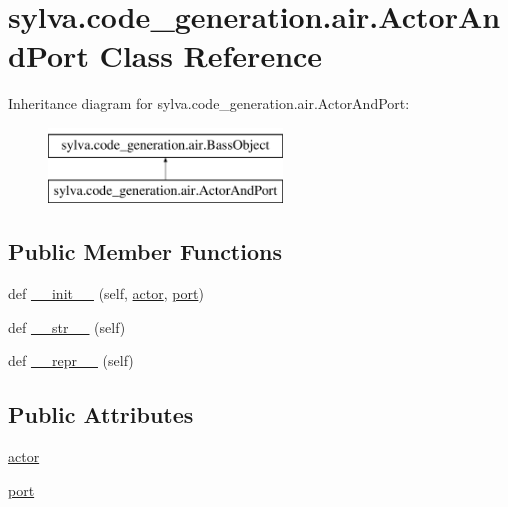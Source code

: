\hypertarget{classsylva_1_1code__generation_1_1air_1_1_actor_and_port}{}\section{sylva.\+code\+\_\+generation.\+air.\+Actor\+And\+Port Class Reference}
\label{classsylva_1_1code__generation_1_1air_1_1_actor_and_port}
Inheritance diagram for sylva.\+code\+\_\+generation.\+air.\+Actor\+And\+Port\+:\begin{figure}[H]
\begin{center}
\leavevmode
\includegraphics[height=2.000000cm]{classsylva_1_1code__generation_1_1air_1_1_actor_and_port}
\end{center}
\end{figure}
\subsection*{Public Member Functions}
\begin{DoxyCompactItemize}
\item 
def \hyperlink{classsylva_1_1code__generation_1_1air_1_1_actor_and_port_ae88892bdf1efb9e78320ff9576f7c576}{\+\_\+\+\_\+init\+\_\+\+\_\+} (self, \hyperlink{classsylva_1_1code__generation_1_1air_1_1_actor_and_port_ae75bb4b57c6e2238f8f2fdadbc52311a}{actor}, \hyperlink{classsylva_1_1code__generation_1_1air_1_1_actor_and_port_a2401a1fc2b007251a2ed4918b484d687}{port})
\item 
def \hyperlink{classsylva_1_1code__generation_1_1air_1_1_bass_object_a2c164720220479369c29db97b67aabe8}{\+\_\+\+\_\+str\+\_\+\+\_\+} (self)
\item 
def \hyperlink{classsylva_1_1code__generation_1_1air_1_1_bass_object_a17548b84b2a55240a429506aed418292}{\+\_\+\+\_\+repr\+\_\+\+\_\+} (self)
\end{DoxyCompactItemize}
\subsection*{Public Attributes}
\begin{DoxyCompactItemize}
\item 
\hyperlink{classsylva_1_1code__generation_1_1air_1_1_actor_and_port_ae75bb4b57c6e2238f8f2fdadbc52311a}{actor}
\item 
\hyperlink{classsylva_1_1code__generation_1_1air_1_1_actor_and_port_a2401a1fc2b007251a2ed4918b484d687}{port}
\end{DoxyCompactItemize}


